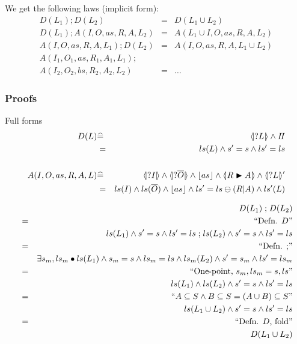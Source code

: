 We get the following laws (implicit form):
\begin{eqnarray*}
   D(L_1) ; D(L_2) &=& D(L_1 \cup L_2)
%
\\ D(L_1) ;  A(I,O,as,R,A,L_2)
   &=&
   A(L_1\cup I,O,as,R,A,L_2)
%
\\  A(I,O,as,R,A,L_1) ; D(L_2)
   &=&
   A(I,O,as,R,A,L_1\cup L_2)
%
\\ A(I_1,O_1,as,R_1,A_1,L_1) ; {}
\\ A(I_2,O_2,bs,R_2,A_2,L_2)
   &=& \dots
\end{eqnarray*}

\subsubsection{Proofs}

Full forms
\begin{eqnarray*}
   D(L) 
   &\defs& \LS{L} \land \Skip
\\ &  =  & ls(L) \land s'=s \land ls'=ls
\\
\\ A(I,O,as,R,A,L)
   &\defs& 
   \LS{I} \land \LS{\B O} \land \ado{as} \land \LUPD{R}{A} \land \LSd{L}
\\ &  =  & ls(I) \land ls(\B O) \land \ado{as} \land \lupd R A \land ls'(L)
\end{eqnarray*}

\begin{eqnarray*}
  && D(L_1) \mathrel{;} D(L_2)
\\&=&\textrm{``Defn. $D$''}
\\&& ls(L_1) \land s'=s \land ls'=ls \mathrel{;} ls(L_2) \land s'=s \land ls'=ls
\\&=&\textrm{``Defn. $\mathrel{;}$''}
\\&& \exists s_m,ls_m \bullet
    ls(L_1) \land s_m=s \land ls_m=ls
    \land ls_m(L_2) \land s'=s_m \land ls'=ls_m
\\&=&\textrm{``One-point, $s_m,ls_m = s,ls$''}
\\&& ls(L_1) \land ls(L_2) \land s'=s \land ls'=ls
\\&=&\textrm{``$A \subseteq S \land B \subseteq S = (A \cup B) \subseteq S$''}
\\&& ls(L_1 \cup L_2) \land s'=s \land ls'=ls
\\&=&\textrm{``Defn. $D$, fold''}
\\&& D(L_1 \cup L_2)
\end{eqnarray*}

